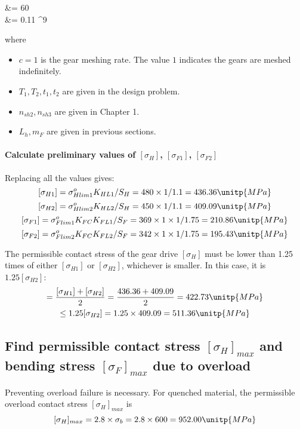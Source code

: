 \begin{itemize}
\begin{flalign*}
	&= 60     \\
	&= 0.11 ^9
	\end{flalign*}
	where\begin{itemize}
		\item $ c=1 $ is the gear meshing rate. The value $ 1 $ indicates the gears are meshed indefinitely.
		\item $ T_1,T_2,t_1,t_2 $ are given in the design problem.
		\item $ n_{sh2}, n_{sh3} $ are given in Chapter 1.
		\item $ L_h, m_F $ are given in previous sections.
	\end{itemize}
\end{itemize}

\paragraph{Calculate preliminary values of $ [\sigma_H] $, $ [\sigma_{F1}] $, $ [\sigma_{F2}] $} Replacing all the values gives:\\
\[ [\sigma_{H1}] = \sigma_{Hlim1}^oK_{HL1}/S_H = 480\times 1/1.1 = 436.36 \unitp{MPa}\]
\[ [\sigma_{H2}] = \sigma_{Hlim2}^oK_{HL2}/S_H = 450\times 1/1.1 = 409.09 \unitp{MPa}\]
\[ [\sigma_{F1}] = \sigma_{Flim1}^oK_{FC}K_{FL1}/S_F = 369\times 1\times 1/1.75  = 210.86\unitp{MPa}\]
\[ [\sigma_{F2}] = \sigma_{Flim2}^oK_{FC}K_{FL2}/S_F = 342\times 1\times 1/1.75  = 195.43 \unitp{MPa}\]

The permissible contact stress of the gear drive $ [\sigma_H] $ must be lower than 1.25 times of either $ [\sigma_{H1}] $ or $ [\sigma_{H2}] $, whichever is smaller. In this case, it is $ 1.25[\sigma_{H2}]$:
\begin{multline*}
[\sigma_H] =\dfrac{[\sigma_{H1}]+[\sigma_{H2}]}{2}= \dfrac{436.36+409.09}{2} = 422.73 \unitp{MPa}\\
\leq 1.25[\sigma_{H2}] = 1.25\times 409.09= 511.36\unitp{MPa}
\end{multline*}

\subsection{Find permissible contact stress $ [\sigma_H]_{max} $ and bending stress $ [\sigma_F]_{max} $ due to overload}
Preventing overload failure is necessary. For quenched material, the permissible overload contact stress $ [\sigma_H]_{max} $ is
\[ [\sigma_H]_{max} = 2.8\times \sigma_b = 2.8\times 600 = 952.00\unitp{MPa} \]

